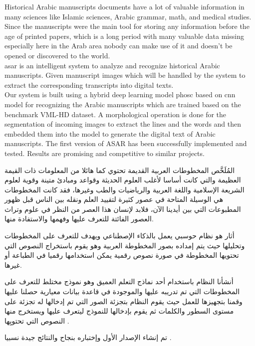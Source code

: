Historical Arabic manuscripts documents have a lot of valuable information in many sciences like Islamic sciences, Arabic grammar, math, and medical studies. Since the manuscripts were the main tool for storing any information before the age of printed papers, which is a long period with many valuable data missing especially here in the Arab area nobody can make use of it and doesn't be opened or discovered to the world. \\


\noindent
\acrfull{asar} is an intelligent system to analyze and recognize historical Arabic manuscripts. Given manuscript images which will be handled by the system to extract the corresponding transcripts into digital texts. \\ 

\noindent
Our system is built using a hybrid deep learning model \acrfull{phosc} based on \acrfull{cnn} model for recognizing the Arabic manuscripts which are trained based on the benchmark VML-HD dataset. A morphological operation is done for the segmentation of incoming images to extract the lines and the words and then embedded them into the model to generate the digital text of Arabic manuscripts. The first version of ASAR has been successfully implemented and tested. Results are promising and competitive to similar projects.

\newpage

\begin{arabtext}
{\huge
المُلَخَّص
}\vspace{20pt}
المخطوطات العربية القديمة تحتوي كما هائلا من المعلومات ذات القيمة العظيمة والتي كانت أساسا لأغلب العلوم الحديثة وقواعد ومبادئ متينة وقوية لعلوم الشريعة الإسلامية واللغة العربية والرياضيات والطب وغيرها، فقد كانت المخطوطات هي الوسيلة المتاحة في عصور كثيرة لتقييد العلم ونقله بين الناس قبل ظهور المطبوعات التي بين أيدينا الآن، فلابد لإنسان هذا العصر من النظر في علوم وتراث العصور الفائتة للتعرف عليها وفهمها والاستفادة منها.

\vspace{\baselineskip}

أثار هو نظام حوسبي يعمل بالذكاء الإصطناعي ويهدف للتعرف على المخطوطات وتحليلها حيث يتم إمداده بصور المخطوطة العربية وهو يقوم باستخراج النصوص التي تحتويها المخطوطة في صورة نصوص رقمية يمكن استخدامها رقميا في الطباعة أو غيرها.

\vspace{\baselineskip}

أنشأنا النظام باستخدام أحد نماذج التعلم العميق وهو نموذج مختلط  للتعرف على المخطوطات التي تم تدريبه عليها والموجودة في قاعدة بيانات معيارية حصلنا عليها وقمنا بتجهيزها للعمل حيث يقوم النظام بتجزئة الصور التي تم إدخالها له تجزئة على مستوى السطور والكلمات ثم يقوم بإدخالها للنموذج ليتعرف عليها ويستخرج منها النصوص التي تحتويِها .

 تم إنشاء الإصدار الأول وإختباره بنجاح والنتائج جيدة نسبيا .
\end{arabtext}
\newpage

